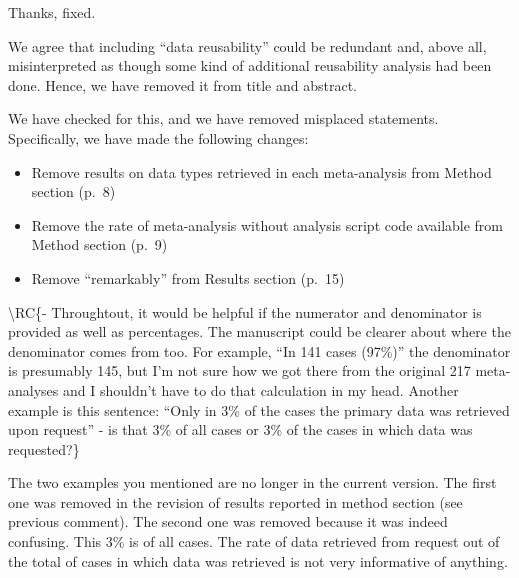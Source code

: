 \documentclass[draft]{article}
\begin{document}

Thanks, fixed.


We agree that including ``data reusability'' could be redundant and, above all, misinterpreted as though some kind of additional reusability analysis had been done. Hence, we have removed it from title and abstract.


We have checked for this, and we have removed misplaced statements. Specifically, we have made the following changes:

\begin{itemize}
\item
  Remove results on data types retrieved in each meta-analysis from Method section (p.~8)
\item
  Remove the rate of meta-analysis without analysis script code available from Method section (p.~9)
\item
  Remove ``remarkably'' from Results section (p.~15)
\end{itemize}

\textbackslash RC\{- Throughtout, it would be helpful if the numerator and denominator is provided as well as percentages. The manuscript could be clearer about where the denominator comes from too. For example, ``In 141 cases (97\%)'' the denominator is presumably 145, but I'm not sure how we got there from the original 217 meta-analyses and I shouldn't have to do that calculation in my head. Another example is this sentence: ``Only in 3\% of the cases the primary data was retrieved upon request'' - is that 3\% of all cases or 3\% of the cases in which data was requested?\}

The two examples you mentioned are no longer in the current version. The first one was removed in the revision of results reported in method section (see previous comment). The second one was removed because it was indeed confusing. This 3\% is of all cases. The rate of data retrieved from request out of the total of cases in which data was retrieved is not very informative of anything.
\end{document}
